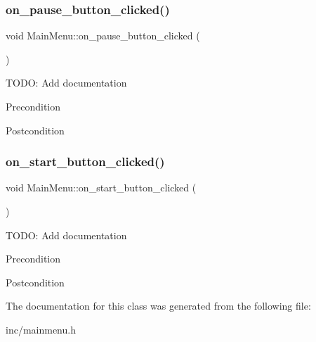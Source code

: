 \subsubsection{\texorpdfstring{on\_pause\_button\_clicked()}{on\_pause\_button\_clicked()}}
{\footnotesize\ttfamily void Main\+Menu\+::on\+\_\+pause\+\_\+button\+\_\+clicked (\begin{DoxyParamCaption}{ }\end{DoxyParamCaption})\hspace{0.3cm}{\ttfamily [protected]}}

T\+O\+DO\+: Add documentation \begin{DoxyPrecond}{Precondition}

\end{DoxyPrecond}
\begin{DoxyPostcond}{Postcondition}

\end{DoxyPostcond}
\mbox{\label{classMainMenu_a49ada5047a5c54593462bf05ccf93c49}} 
\subsubsection{\texorpdfstring{on\_start\_button\_clicked()}{on\_start\_button\_clicked()}}
{\footnotesize\ttfamily void Main\+Menu\+::on\+\_\+start\+\_\+button\+\_\+clicked (\begin{DoxyParamCaption}{ }\end{DoxyParamCaption})\hspace{0.3cm}{\ttfamily [protected]}}

T\+O\+DO\+: Add documentation \begin{DoxyPrecond}{Precondition}

\end{DoxyPrecond}
\begin{DoxyPostcond}{Postcondition}

\end{DoxyPostcond}


The documentation for this class was generated from the following file\+:\begin{DoxyCompactItemize}
\item 
inc/mainmenu.\+h\end{DoxyCompactItemize}
